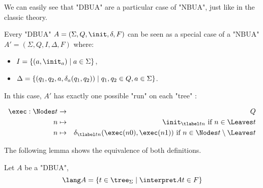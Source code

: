\documentclass[a4paper,UKenglish,cleveref, autoref, thm-restate]{lipics-v2021}
\begin{document}
We can easily see that "DBUA" are a particular case of "NBUA", just like in the classic theory.

\begin{remark}
	Every "DBUA" $A = (\Sigma, Q, \init, \delta, F)$ can be seen as a special case of a "NBUA"
	$A' = (\Sigma, Q, I, \Delta, F)$ where:
	\begin{itemize}
		\item $I = \setdef{(a, \init_a)}{a \in \Sigma}$,
		\item $\Delta = \left\{(q_1, q_2, a, \delta_a(q_1, q_2)) \mid q_1, q_2 \in Q, a \in \Sigma\right\}$.
	\end{itemize}

	In this case, $A'$ has exactly one possible "run" on each "tree" :

	\begin{eqnarray*}
		\exec : \Nodes t &\to & Q \\
		n  &\mapsto& \init_{\tlabel t n} \text{ if } n \in \Leaves t \\
		n  &\mapsto& \delta_{\tlabel t n}(\exec (n0), \exec (n1)) \text{ if } n \in \Nodes t \setminus \Leaves t
	\end{eqnarray*}
\end{remark}

The following lemma shows the equivalence of both definitions.

\begin{lemma}
	Let $A$ be a "DBUA",
	\[ \lang A = \setdef {t \in \tree_{\Sigma}} {\interpret A t \in F} \]
\end{lemma}
\end{document}
